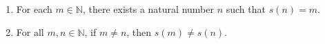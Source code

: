 \begin{previewactivity}
\begin{enumerate}
\begin{enumerate}
\begin{enumerate}
  \item For each  $m \in \mathbb{N}$, there exists a natural number  $n$  such that  
$s( n ) = m$.

  \item For all $m, n \in \mathbb{N}$, if  $m \ne n$, then  $s( m ) \ne s( n )$.
\end{enumerate}

\end{enumerate}
\end{enumerate}

\end{previewactivity}
\hbreak

\endinput

